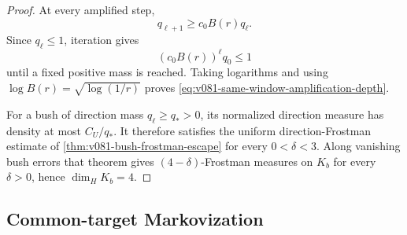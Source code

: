 \documentclass[10pt]{article}
\begin{document}
\begin{proof}
At every amplified step,
\[
q_{\ell+1}\ge c_0B(r)q_\ell.
\]
Since \(q_\ell\le1\), iteration gives
\[
(c_0B(r))^\ell q_0\le1
\]
until a fixed positive mass is reached.  Taking logarithms and using
\(\log B(r)=\sqrt{\log(1/r)}\) proves
\eqref{eq:v081-same-window-amplification-depth}.

For a bush of direction mass \(q_\ell\ge q_*>0\), its normalized direction measure has density at
most \(C_U/q_*\).  It therefore satisfies the uniform direction-Frostman estimate of
\cref{thm:v081-bush-frostman-escape} for every \(0<\delta<3\).  Along vanishing bush errors that
theorem gives \((4-\delta)\)-Frostman measures on \(K_b\) for every \(\delta>0\), hence
\(\dim_HK_b=4\).
\end{proof}

\subsection{Common-target Markovization}
\end{document}
